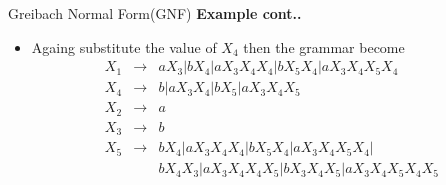 \documentclass{beamer}
\begin{document}
\begin{frame}{Greibach Normal Form(GNF)}
	\textbf{Example cont..}
	\begin{itemize}
		\item Againg substitute the value of $X_4$ then the grammar become
		\begin{eqnarray*}
			X_1&\rightarrow& aX_3|bX_4|aX_3X_4X_4|bX_5X_4|aX_3X_4X_5X_4 \\
			X_4&\rightarrow& b|aX_3X_4|bX_5|aX_3X_4X_5 \\
			X_2&\rightarrow&  a\\
			X_3&\rightarrow& b\\
			X_5&\rightarrow& bX_4|aX_3X_4X_4|bX_5X_4|aX_3X_4X_5X_4|\\
			& &bX_4X_3|aX_3X_4X_4X_5|bX_3X_4X_5|aX_3X_4X_5X_4X_5\\
		\end{eqnarray*}
	\end{itemize}
\end{frame}
\end{document}
